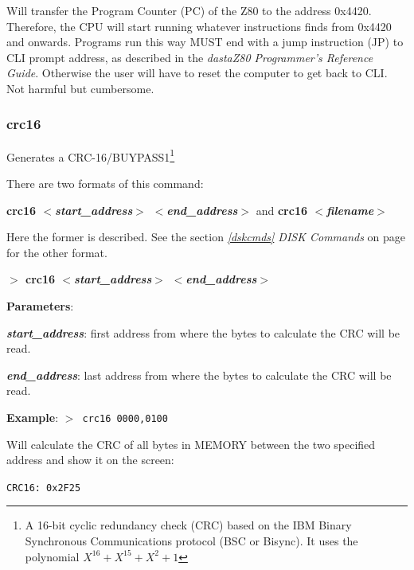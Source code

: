 \documentclass[a4paper,11pt]{article}
\begin{document}
        Will transfer the Program Counter (PC) of the Z80 to the address
        0x4420. Therefore, the CPU will start running whatever instructions
        finds from 0x4420 and onwards. Programs run this way MUST end with a
        jump instruction (JP) to CLI prompt address, as described in the
        \textit{dastaZ80 Programmer’s Reference Guide}\cite{dastaz80progref}.
        Otherwise the user will have to reset the computer to get back to CLI.
        Not harmful but cumbersome.

        \subsubsection{{\color{blue}crc16}}
        Generates a CRC-16/BUYPASS1\footnote{A 16-bit cyclic redundancy
        check (CRC) based on the IBM Binary Synchronous Communications
        protocol\cite{ibmbsc} (BSC or Bisync). It uses the polynomial
        $X^{16} + X^{15} +X^2 + 1$}

        There are two formats of this command: 
        
        \textbf{crc16 \textit{$<$start\_address$>$ $<$end\_address$>$}}
        and \textbf{crc16 \textit{$<$filename$>$}} 
        
        Here the former is described. See the section \textit{\ref{dskcmds} 
        DISK Commands} on page \pageref{dskcmds} for the other format.

        \hspace{1.9cm}\textbf{$>$ crc16 \textit{$<$start\_address$>$
        $<$end\_address$>$}}
        
        \textbf{Parameters}:

        \hspace{1cm}\textbf{\textit{start\_address}}: first address from
        where the bytes to calculate the CRC will be read.

        \hspace{1cm}\textbf{\textit{end\_address}}: last address from where
        the bytes to calculate the CRC will be read.

        \textbf{Example}: \texttt{$>$ crc16 0000,0100}

        Will calculate the CRC of all bytes in MEMORY between the two
        specified address and show it on the screen:
        
        \hspace{1cm}\texttt{CRC16:\ 0x2F25}
\end{document}
